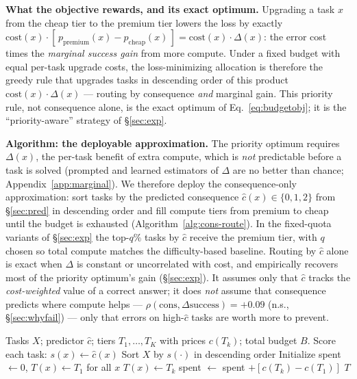 \documentclass{article}
\begin{document}
\textbf{What the objective rewards, and its exact optimum.} Upgrading
a task $x$ from the cheap tier to the premium tier lowers the loss by
exactly $\mathrm{cost}(x)\cdot[\,p_{\mathrm{premium}}(x) -
p_{\mathrm{cheap}}(x)\,] = \mathrm{cost}(x)\cdot\Delta(x)$: the error
cost times the \emph{marginal success gain} from more compute. Under a
fixed budget with equal per-task upgrade costs, the loss-minimizing
allocation is therefore the greedy rule that upgrades tasks in
descending order of this product $\mathrm{cost}(x)\cdot\Delta(x)$ ---
routing by consequence \emph{and} marginal gain. This priority rule,
not consequence alone, is the exact optimum of
Eq.~\ref{eq:budgetobj}; it is the ``priority-aware'' strategy of
\S\ref{sec:exp}.

\textbf{Algorithm: the deployable approximation.} The priority optimum
requires $\Delta(x)$, the per-task benefit of extra compute, which is
\emph{not} predictable before a task is solved (prompted and learned
estimators of $\Delta$ are no better than chance;
Appendix~\ref{app:marginal}). We therefore deploy the
consequence-only approximation: sort tasks by the predicted
consequence $\hat{c}(x)\in\{0,1,2\}$ from \S\ref{sec:pred} in
descending order and fill compute tiers from premium to cheap until the
budget is exhausted (Algorithm~\ref{alg:cons-route}). In the
fixed-quota variants of \S\ref{sec:exp} the top-$q\%$ tasks by
$\hat{c}$ receive the premium tier, with $q$ chosen so total compute
matches the difficulty-based baseline. Routing by $\hat{c}$ alone is
exact when $\Delta$ is constant or uncorrelated with cost, and
empirically recovers most of the priority optimum's gain
(\S\ref{sec:exp}). It assumes only that $\hat{c}$ tracks the
\emph{cost-weighted} value of a correct answer; it does \emph{not}
assume that consequence predicts where compute helps ---
$\rho(\mathrm{cons}, \Delta\mathrm{success}) = +0.09$ (n.s.,
\S\ref{sec:whyfail}) --- only that errors on high-$\hat{c}$ tasks
are worth more to prevent.

\begin{algorithm}
\caption{Cost-weighted compute allocation}\label{alg:cons-route}
\begin{algorithmic}[1]
\REQUIRE Tasks $X$; predictor $\hat{c}$; tiers $T_1, \ldots, T_K$ with prices $c(T_k)$; total budget $B$.
\STATE Score each task: $s(x) \leftarrow \hat{c}(x)$
\STATE Sort $X$ by $s(\cdot)$ in descending order
\STATE Initialize spent $\leftarrow 0$, $T(x) \leftarrow T_1$ for all $x$
      \STATE $T(x) \leftarrow T_k$
      \STATE spent $\leftarrow$ spent $+ [c(T_k) - c(T_1)]$
    \ENDIF
  \ENDFOR
\ENDFOR
\RETURN $T$
\end{algorithmic}
\end{algorithm}
\end{document}
